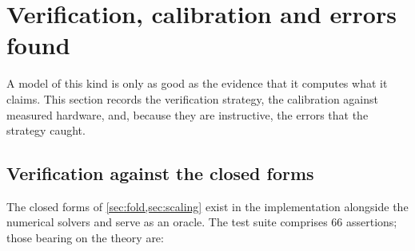 ﻿\section{Verification, calibration and errors found}
\label{sec:verification}

A model of this kind is only as good as the evidence that it computes what it
claims. This section records the verification strategy, the calibration against
measured hardware, and, because they are instructive, the errors that the
strategy caught.

\subsection{Verification against the closed forms}

The closed forms of \cref{sec:fold,sec:scaling} exist in the implementation
alongside the numerical solvers and serve as an oracle. The test suite
comprises 66 assertions; those bearing on the theory are:

